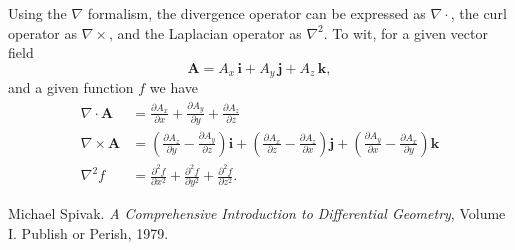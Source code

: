 \documentclass{article}
\newcommand{\lp}{\left(}
\newcommand{\rp}{\right)}
\newcommand{\vi}{\mathbf{i}}
\newcommand{\vj}{\mathbf{j}}
\newcommand{\vk}{\mathbf{k}}
\newcommand{\vA}{\mathbf{A}}
\begin{document}
Using the $\nabla$ formalism,
the divergence operator can be expressed as
$\nabla\cdot$, the curl operator as $\nabla\times$, and the
Laplacian operator as $\nabla^2$. To wit, for a given vector field
$$\vA = A_x\, \vi + A_y\, \vj + A_z\, \vk,$$ and a given function $f$
we have
\begin{align*}
\nabla\cdot \vA &= \frac{\partial A_x}{\partial x} +
\frac{\partial A_y}{\partial y} +\frac{\partial A_z}{\partial z} \\
\nabla\times \vA &=
\lp\frac{\partial A_z}{\partial y} - \frac{\partial A_y}{\partial z}
\rp \vi+
\lp \frac{\partial A_x}{\partial z} -
\frac{\partial A_z}{\partial x}\rp \vj+
\lp \frac{\partial A_y}{\partial x} -
\frac{\partial A_x}{\partial y}\rp \vk\\
\nabla^2 f &= \frac{\partial^2 f}{\partial x^2} +
\frac{\partial^2 f}{\partial y^2} +\frac{\partial^2 f}{\partial z^2}.
\end{align*}

\begin{thebibliography}{3}
Michael Spivak. \emph{A Comprehensive Introduction to Differential Geometry},
Volume I. Publish or Perish, 1979.
\end{thebibliography}
\end{document}
